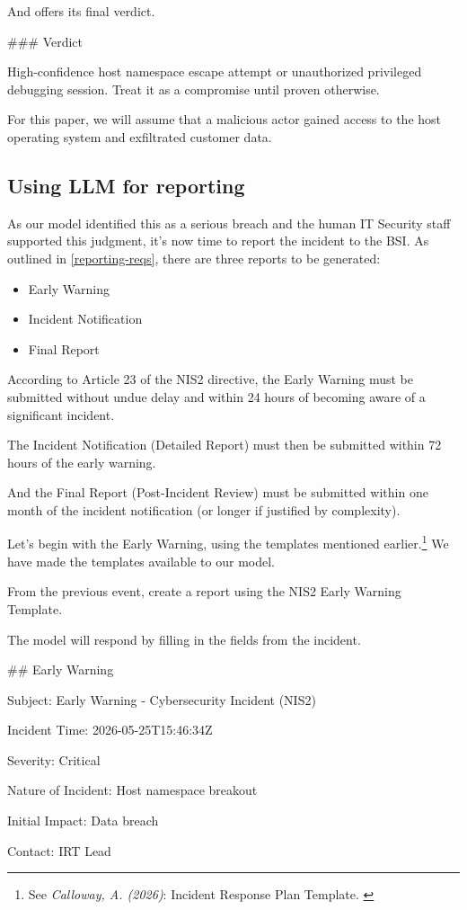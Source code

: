 And offers its final verdict.

\indent\colorbox{codegrey}{
    \parbox{0.8\linewidth}{
\#\#\# Verdict

High-confidence host namespace escape attempt or unauthorized privileged debugging session. Treat it as a compromise until proven otherwise.
    }
}

For this paper, we will assume that a malicious actor gained access to the host operating system and exfiltrated customer data.

\subsection{Using LLM for reporting}\label{reporting}

As our model identified this as a serious breach and the human IT Security staff supported this judgment, it's now time to report the incident to the BSI. As outlined in \ref{reporting-reqs}, there are three reports to be generated:

\begin{itemize}
    \item Early Warning
    \item Incident Notification
    \item Final Report
\end{itemize}

According to Article 23 of the NIS2 directive, the Early Warning must be submitted without undue delay and within 24 hours of becoming aware of a significant incident.

The Incident Notification (Detailed Report) must then be submitted within 72 hours of the early warning.

And the Final Report (Post-Incident Review) must be submitted within one month of the incident notification (or longer if justified by complexity).

Let's begin with the Early Warning, using the templates mentioned earlier.\footnote{See \textit{Calloway, A. (2026)}: Incident Response Plan Template. \cite{responsePlan}} We have made the templates available to our model.

\indent\colorbox{codegrey}{
    \parbox{0.8\linewidth}{
From the previous event, create a report using the NIS2 Early Warning Template.
     }
}

The model will respond by filling in the fields from the incident.

\indent\colorbox{codegrey}{
    \parbox{0.8\linewidth}{
\#\# Early Warning

Subject: Early Warning - Cybersecurity Incident (NIS2)

Incident Time: 2026-05-25T15:46:34Z

Severity: Critical

Nature of Incident: Host namespace breakout

Initial Impact: Data breach

Contact: IRT Lead
    }
}

